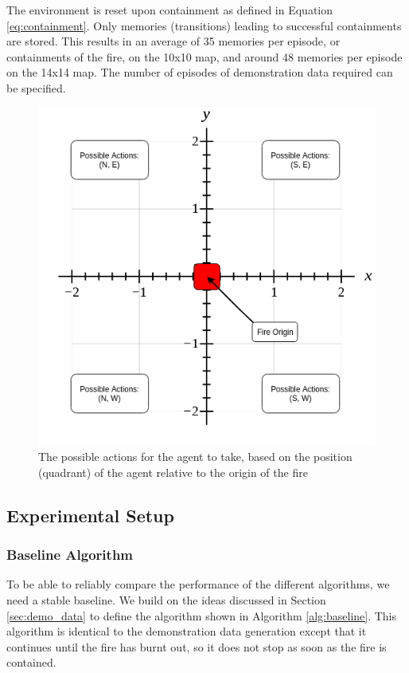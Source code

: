 The environment is reset upon containment as defined in Equation \eqref{eq:containment}. Only memories (transitions) leading to successful containments are stored. This results in an average of 35 memories per episode, or containments of the fire, on the 10x10 map, and around 48 memories per episode on the 14x14 map. The number of episodes of demonstration data required can be specified.

\begin{figure}[h]
    \centering
    \includegraphics[width=1\linewidth]{img/Demo-data_Baseline.png}
    \caption{The possible actions for the agent to take, based on the position (quadrant) of the agent relative to the origin of the fire}
    \label{fig:demodata}
\end{figure}



\subsection{Experimental Setup}\label{sec:experiment}

\subsubsection{Baseline Algorithm}\label{sec:baseline}
To be able to reliably compare the performance of the different algorithms, we need a stable baseline. We build on the ideas discussed in Section \ref{sec:demo_data} to define the algorithm shown in Algorithm \ref{alg:baseline}. This algorithm is identical to the demonstration data generation except that it continues until the fire has burnt out, so it does not stop as soon as the fire is contained.

